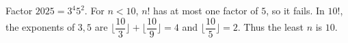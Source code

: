 Factor $2025=3^4 5^2$. For $n<10$, $n!$ has at most one factor of $5$, so it fails. In $10!$, the exponents of $3,5$ are $\lfloor \dfrac{10}{3} \rfloor + \lfloor \dfrac{10}{9} \rfloor = 4$ and $\lfloor \dfrac{10}{5} \rfloor = 2$. Thus the least $n$ is $\boxed{10}$.
